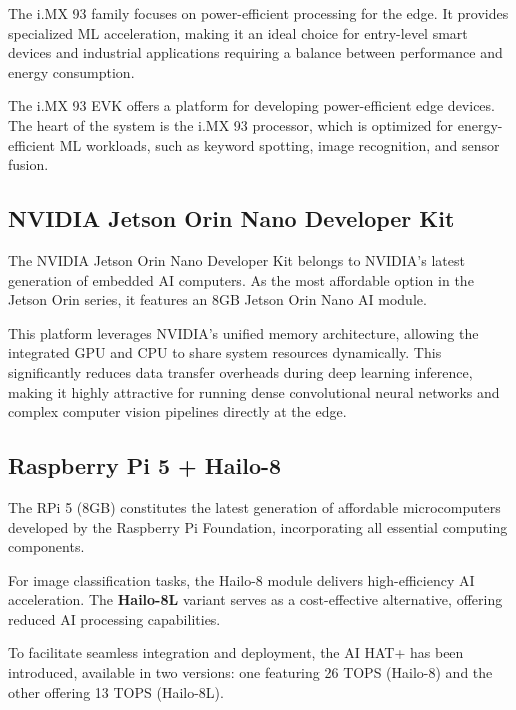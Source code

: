 The i.MX 93 \cite{IMX93} family focuses on power-efficient processing for the edge. It provides specialized \gls{ML} acceleration, making it an ideal choice for entry-level smart devices and industrial applications requiring a balance between performance and energy consumption.

The i.MX 93 \gls{EVK} \cite{IMX93Evaluation} offers a platform for developing power-efficient edge devices. The heart of the system is the i.MX 93 processor, which is optimized for energy-efficient \gls{ML} workloads, such as keyword spotting, image recognition, and sensor fusion.

\subsection{NVIDIA Jetson Orin Nano Developer Kit}
    
The NVIDIA Jetson Orin Nano Developer Kit \cite{NVIDIAJetsonAGX} belongs to NVIDIA's latest generation of embedded \gls{AI} computers. As the most affordable option in the Jetson Orin series, it features an 8GB Jetson Orin Nano \gls{AI} module. 

This platform leverages NVIDIA's unified memory architecture, allowing the integrated GPU and CPU to share system resources dynamically. This significantly reduces data transfer overheads during deep learning inference, making it highly attractive for running dense convolutional neural networks and complex computer vision pipelines directly at the edge.

\subsection{Raspberry Pi 5 + Hailo-8}
    
The \gls{RPi} 5 (8GB) \cite{ltdBuyRaspberryPib} constitutes the latest generation of affordable microcomputers developed by the Raspberry Pi Foundation, incorporating all essential computing components.
    
For image classification tasks, the Hailo-8 module \cite{AIAcceleratorHailo8} delivers high-efficiency \gls{AI} acceleration. The \textbf{Hailo-8L} variant \cite{Hailo8LEntryLevelAIa} serves as a cost-effective alternative, offering reduced AI processing capabilities.
    
To facilitate seamless integration and deployment, the \gls{AI} HAT+ \cite{AIHATsRaspberry} has been introduced, available in two versions: one featuring 26 \gls{TOPS} (Hailo-8) and the other offering 13 \gls{TOPS} (Hailo-8L).

